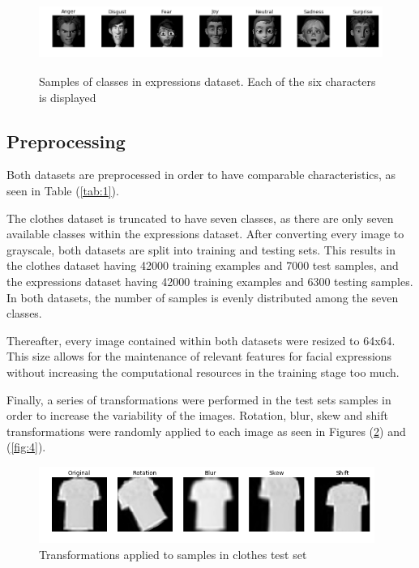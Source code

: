 \documentclass{article}
\begin{document}
\begin{figure}[tb]
    \vskip 5mm
        \begin{center}
            \includegraphics[width=\textwidth,height=2.5cm]{original_expressions}
            \caption{Samples of classes in expressions dataset. Each of the six characters is displayed}
            \label{fig:2}
        \end{center}
    \vskip -5mm
\end{figure}

\subsection{Preprocessing}
\label{sec:preprocessing}

Both datasets are preprocessed in order to have comparable characteristics, as seen in Table (\ref{tab:1}). 

The clothes dataset is truncated to have seven classes, as there are only seven available classes within the expressions dataset. After converting every image to grayscale, both datasets are split into training and testing sets. This results in the clothes dataset having 42000 training examples and 7000 test samples, and the expressions dataset having 42000 training examples and 6300 testing samples. In both datasets, the number of samples is evenly distributed among the seven classes.

Thereafter, every image contained within both datasets were resized to 64x64. This size allows for the maintenance of relevant features for facial expressions without increasing the computational resources in the training stage too much.

Finally, a series of transformations were performed in the test sets samples in order to increase the variability of the images. Rotation, blur, skew and shift transformations were randomly applied to each image as seen in Figures (\ref{fig:3}) and (\ref{fig:4}).

\begin{figure}[!htb]
    \vskip 5mm
        \begin{center}
            \includegraphics[height=2.5cm]{augmented_clothes}
            \caption{Transformations applied to samples in clothes test set}
            \label{fig:3}
        \end{center}
    \vskip -5mm
\end{figure}
\end{document}
